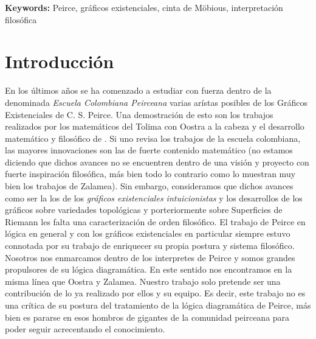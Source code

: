 \documentclass[
	fontsize=10pt, %
	twoside=false, %
	secnumdepth=1, %
	abstract=true, %
]{kaohandt}
\begin{document}
{\noindent\textbf{Keywords:} Peirce, gráficos existenciales, cinta de Möbious, interpretación filosófica}

\medskip


\section{Introducción}
\label{sec:Introducción}

En los últimos años se ha comenzado a estudiar con fuerza dentro de la denominada \textit{Escuela Colombiana Peirceana} varias arístas posibles de los Gráficos Existenciales de C. S. Peirce. Una demostración de esto son los trabajos realizados por los matemáticos del Tolima con Oostra a la cabeza  y el desarrollo matemático y filosófico de . Si uno revisa los trabajos de la escuela colombiana, las mayores innovaciones son las de fuerte contenido matemático (no estamos diciendo que dichos avances no se encuentren dentro de una visión y proyecto con fuerte inspiración filosófica, más bien todo lo contrario como lo muestran muy bien los trabajos de Zalamea). Sin embargo, consideramos que dichos avances como ser la los de los \textit{gráficos existenciales intuicionistas} y los desarrollos de los gráficos sobre variedades topológicas y porteriormente sobre Superficies de Riemann les falta una caracterización de orden filosófico. El trabajo de Peirce en lógica en general y con los gráficos existenciales en particular siempre estuvo connotada por su trabajo de enriquecer su propia postura y sistema filosófico. Nosotros nos enmarcamos dentro de los interpretes de Peirce y somos grandes propulsores de su lógica diagramática. En este sentido nos encontramos en la misma línea que Oostra y Zalamea. Nuestro trabajo solo pretende ser una contribución de lo ya realizado por ellos y su equipo. Es decir, este trabajo no es una crítica de su postura del tratamiento de la lógica diagramática de Peirce, más bien es pararse en esos hombros de gigantes de la comunidad peirceana para poder seguir acrecentando el conocimiento.
\end{document}
